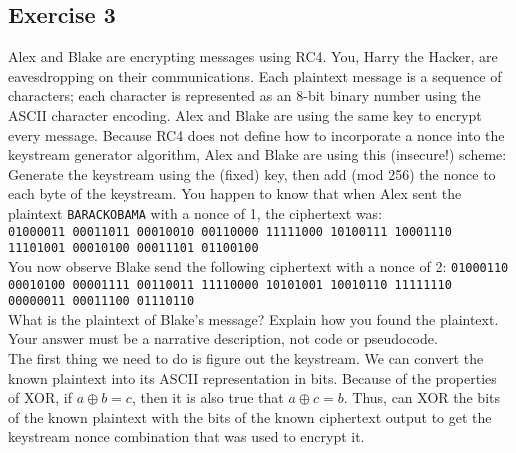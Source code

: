 \documentclass{math}
\begin{document}
\subsection*{Exercise 3}
Alex and Blake are encrypting messages using RC4. You, Harry the Hacker, are
eavesdropping on their communications. Each plaintext message is a sequence of
characters; each character is represented as an 8-bit binary number using the
ASCII character encoding. Alex and Blake are using the same key to encrypt
every message. Because RC4 does not define how to incorporate a nonce into the
keystream generator algorithm, Alex and Blake are using this (insecure!)
scheme: Generate the keystream using the (fixed) key, then add (mod 256) the
nonce to each byte of the keystream. You happen to know that when Alex sent the
plaintext \texttt{BARACKOBAMA} with a nonce of 1, the ciphertext was: \\
\texttt{01000011 00011011 00010010 00110000 11111000 10100111 10001110 11101001
00010100 00011101 01100100} \\
You now observe Blake send the following ciphertext with a nonce of 2:
\texttt{01000110 00010100 00001111 00110011 11110000 10101001 10010110 11111110
00000011 00011100 01110110} \\
What is the plaintext of Blake's message? Explain how you found the plaintext.
Your answer must be a narrative description, not code or pseudocode. \\[1cm]
The first thing we need to do is figure out the keystream. We can convert the
known plaintext into its ASCII representation in bits. Because of the
properties of XOR, if \( a\oplus b = c \), then it is also true that
\( a\oplus c = b \). Thus, can XOR the bits of the known plaintext with the bits
of the known ciphertext output to get the keystream nonce combination that was
used to encrypt it.
\begin{center}
\end{center}
\end{document}
